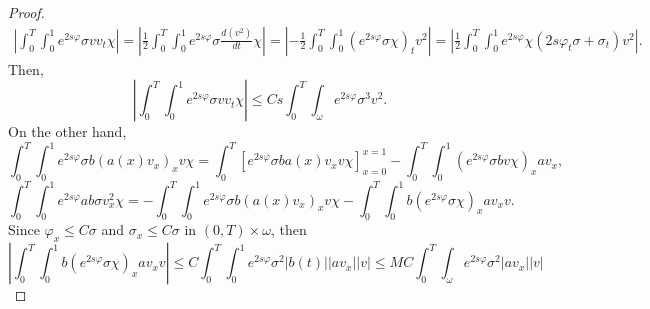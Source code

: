 \documentclass[11pt,oneside,a4papper]{osajnl}
\begin{document}
\begin{proof}
\begin{multline*}
        \left|  \int_0^T \int_0^{1}  e^{2s\varphi}\sigma v v_t \chi  \right|=\left| \frac{1}{2} \int_0^T \int_0^{1}  e^{2s\varphi}\sigma \frac{d (v^2)}{dt} \chi \right|=\left| -\frac{1}{2} \int_0^T \int_0^{1}  (e^{2s\varphi}\sigma\chi)_t v^2  \right|
        =\left| \frac{1}{2} \int_0^T \int_0^{1} e^{2s\varphi}\chi (2s\varphi_t\sigma+\sigma_t) v^2  \right|.
    \end{multline*}
    Then,
    \begin{equation}\label{ecA6}
        \left|  \int_0^T \int_0^{1}  e^{2s\varphi}\sigma v v_t \chi \right|\leq C s\int_0^T \int_\omega e^{2s\varphi}\sigma^3 v^2.
    \end{equation}
    On the other hand, %
    $$ \int_0^T \int_0^{1}e^{2s\varphi}\sigma b\left(a(x)v_x\right)_x v\chi=  \int_0^T \left[ e^{2s\varphi}\sigma b a(x)v_x v\chi \right]_{x=0}^{x=1}- \int_0^T \int_0^{1}\left(e^{2s\varphi}\sigma b v\chi \right)_x a v_x, $$
    $$\int_0^T \int_0^{1}e^{2s\varphi} ab \sigma v_x^2\chi=-\int_0^T \int_0^{1}e^{2s\varphi}\sigma b\left(a(x)v_x\right)_x v\chi-\int_0^T \int_0^{1} b\left(e^{2s\varphi}\sigma \chi \right)_x a v_x v.$$
    Since $\varphi_x\leq C \sigma$ and $\sigma_x\leq C\sigma$ in $(0,T)\times \omega$, then
    \begin{equation}\label{ecA7}
		\left|  \int_0^T \int_0^{1} b\left(e^{2s\varphi}\sigma \chi \right)_x a v_x v \right|\leq C \int_0^T \int_0^{1} e^{2s\varphi} \sigma^2 |b(t)| |av_x| |v|\leq MC\int_0^T \int_\omega e^{2s\varphi} \sigma^2 |av_x| |v|
    \end{equation}


\end{proof}
\end{document}
